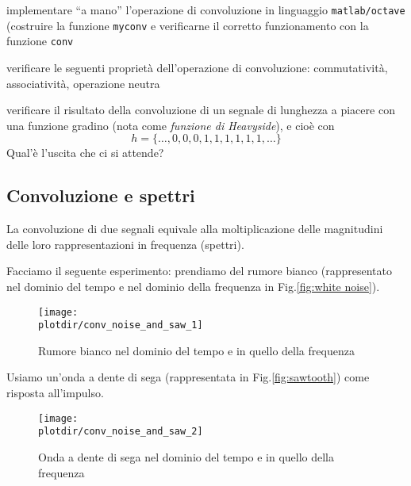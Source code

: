 \begin{compactenum}

  \item implementare ``a mano'' l'operazione di convoluzione in linguaggio {\tt matlab/octave} (costruire la funzione {\tt myconv}
        e verificarne il corretto funzionamento con la funzione {\tt conv}

  \item verificare le seguenti propriet\`a dell'operazione di convoluzione:
        commutativit\`a, associativit\`a, operazione neutra

  \item verificare il risultato della convoluzione di un segnale di lunghezza
        a piacere con una funzione gradino (nota come \emph{funzione di
        Heavyside}), e cio\`e con 
			  \begin{equation}	
				   h = \{ \ldots, 0, 0, 0, 1, 1, 1, 1, 1, 1, \ldots \}\nonumber
				\end{equation}
        Qual'\`e l'uscita che ci si attende?

\end{compactenum}

%
\subsection{Convoluzione e spettri}

La convoluzione di due segnali equivale alla moltiplicazione delle magnitudini
delle loro rappresentazioni in frequenza (spettri).

Facciamo il seguente esperimento:
prendiamo del rumore bianco (rappresentato nel dominio del tempo e nel dominio
della frequenza in Fig.\vref{fig:white noise}).

\begin{figure}[hbt]
  \begin{center}
	  \texttt{[image: \\plotdir/conv\_noise\_and\_saw\_1]}
   \end{center}
	\caption{Rumore bianco nel dominio del tempo e in quello della frequenza\label{fig:white noise}}
\end{figure}

Usiamo un'onda a dente di sega (rappresentata in Fig.\vref{fig:sawtooth}) come
risposta all'impulso.

\begin{figure}[hbt]
  \begin{center}
	  \texttt{[image: \\plotdir/conv\_noise\_and\_saw\_2]}
  \end{center}
	\caption{Onda a dente di sega nel dominio del tempo e in quello della frequenza\label{fig:sawtooth}}
\end{figure}

